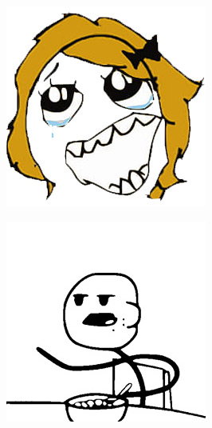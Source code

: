 \begin{multicols}{8}
\begin{center}
\includegraphics[width=\linewidth]{./IMG-GIT/MEMES/Meme-Faces-5.jpg}
\end{center}

\begin{center}
\includegraphics[width=\linewidth]{./IMG-GIT/MEMES/Meme-cara-comiendo.jpg} 
\end{center}


\end{multicols}
